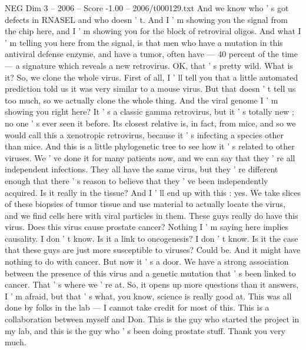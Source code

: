 \begin{textsample}{NEG Dim 3 – 2006 – Score -1.00 – 2006/t000129.txt}
And we know who ' s got defects in RNASEL and who doesn ' t.
And I ' m showing you the signal from the chip here, and I ' m showing you for the block of retroviral oligos.
And what I ' m telling you here from the signal, is that men who have a mutation in this antiviral defense enzyme, and have a tumor, often have — 40 percent of the time — a signature which reveals a new retrovirus.
OK, that ' s pretty wild.
What is it?
So, we clone the whole virus.
First of all, I ' ll tell you that a little automated prediction told us it was very similar to a mouse virus.
But that doesn ' t tell us too much, so we actually clone the whole thing.
And the viral genome I ' m showing you right here?
It ' s a classic gamma retrovirus, but it ' s totally new ; no one ' s ever seen it before.
Its closest relative is, in fact, from mice, and so we would call this a xenotropic retrovirus, because it ' s infecting a species other than mice.
And this is a little phylogenetic tree to see how it ' s related to other viruses.
We ' ve done it for many patients now, and we can say that they ' re all independent infections.
They all have the same virus, but they ' re different enough that there ' s reason to believe that they ' ve been independently acquired.
Is it really in the tissue?
And I ' ll end up with this : yes.
We take slices of these biopsies of tumor tissue and use material to actually locate the virus, and we find cells here with viral particles in them.
These guys really do have this virus.
Does this virus cause prostate cancer?
Nothing I ' m saying here implies causality.
I don ' t know.
Is it a link to oncogenesis?
I don ' t know.
Is it the case that these guys are just more susceptible to viruses?
Could be.
And it might have nothing to do with cancer.
But now it ' s a door.
We have a strong association between the presence of this virus and a genetic mutation that ' s been linked to cancer.
That ' s where we ' re at.
So, it opens up more questions than it answers, I ' m afraid, but that ' s what, you know, science is really good at.
This was all done by folks in the lab — I cannot take credit for most of this.
This is a collaboration between myself and Don.
This is the guy who started the project in my lab, and this is the guy who ' s been doing prostate stuff.
Thank you very much.

\end{textsample}
